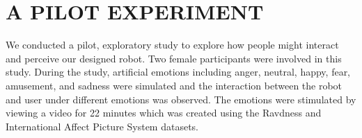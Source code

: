 \documentclass[letterpaper, 10 pt, conference]{ieeeconf}  %
\begin{document}


\section{A PILOT EXPERIMENT}
We conducted a pilot, exploratory study to explore how people might interact and perceive our designed robot. Two female participants were involved in this study. During the study, artificial emotions including anger, neutral, happy, fear, amusement, and sadness were simulated and the interaction between the robot and user under different emotions was observed. 
The emotions were stimulated by viewing a video for 22 minutes which was created using the Ravdness \cite{eerola2011comparison} and International Affect Picture System \cite{lang1997international} datasets. 

\end{document}
